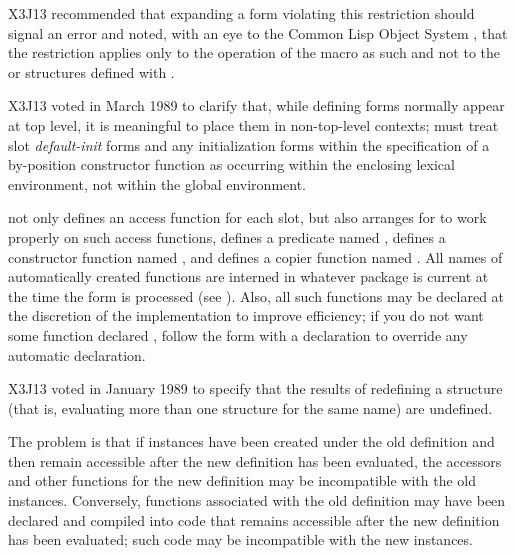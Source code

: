 \begin{defmac}
\begin{new}
X3J13 recommended that expanding
a  form violating this
restriction should signal an error and noted, with an eye to the Common Lisp
Object System
, that the restriction applies only to the operation of the
 macro as such and not to the  or
structures defined with .
\end{new}

\begin{newer}
X3J13 voted in March 1989 
to clarify that, while defining forms normally appear at top level,
it is meaningful to place them in non-top-level contexts;
 must treat slot \emph{default-init} forms
and any
initialization forms within the specification of a by-position
constructor function as occurring
within the enclosing lexical environment, not within the global
environment.
\end{newer}

 not only defines an access function for each slot, but also
arranges for  to work properly on such access functions,
defines a predicate named ,
defines a constructor function named ,
and defines a copier function named .
All names of automatically created functions are interned
in whatever package is current at the time the 
form is processed (see ).
Also, all such functions may be declared 
at the discretion of the implementation to improve efficiency;
if you do not want some function declared ,
follow the  form with a  declaration
to override any automatic  declaration.

\begin{newer}
X3J13 voted in January 1989 
to specify that the results of redefining a  structure
(that is, evaluating more than one  structure
for the same name) are undefined.

The problem is that if instances have been created under the old definition
and then remain accessible after the new definition has been evaluated,
the accessors and other functions for the new definition may be incompatible
with the old instances.  Conversely, functions associated with the
old definition may have been declared  and compiled
into code that remains accessible after the new definition has been
evaluated; such code may be incompatible with the new instances.


\end{newer}
\end{defmac}
